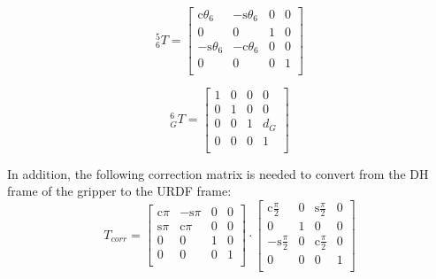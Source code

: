 \documentclass[twoside]{article}
\renewcommand{\c}{\text{c}}
\newcommand{\s}{\text{s}}
\newcommand{\T}[2]{\mbox{$_{#2}^{#1}{T}$}}
\begin{document}
\begin{minipage}{0.33\linewidth}
\begin{equation}
\T{5}{6} =
\begin{bmatrix}
  \c\theta_6 & -\s\theta_6 & 0 & 0 \\
           0 &           0 & 1 & 0 \\
 -\s\theta_6 & -\c\theta_6 & 0 & 0 \\
           0 &           0 & 0 & 1 \\
\end{bmatrix}
\end{equation}
\end{minipage}%
\begin{minipage}{0.33\linewidth}
\begin{equation}
\T{6}{G} =
\begin{bmatrix}
  1 & 0 & 0 &   0 \\
  0 & 1 & 0 &   0 \\
  0 & 0 & 1 & d_G \\
  0 & 0 & 0 &   1 \\
\end{bmatrix}
\end{equation}
\end{minipage}%
\begin{minipage}{0.33\linewidth}
\end{minipage}

\vspace{1ex}

In addition, the following correction matrix is needed to convert from the DH frame of the
gripper to the URDF frame:
\begin{equation}
  T_{corr} =
  \begin{bmatrix}
    \c\pi &  -\s\pi &  0 &  0 \\
    \s\pi &  \c\pi  &  0 &  0 \\
        0 &         0 &  1 &  0 \\
        0 &         0 &  0 &  1 \\
  \end{bmatrix}
  \cdot
  \begin{bmatrix}
      \c\frac{\pi}{2} &  0 &  \s\frac{\pi}{2} &  0 \\
               0 &  1 &           0 &  0 \\
     -\s\frac{\pi}{2} &  0 &  \c\frac{\pi}{2} &  0 \\
               0 &  0 &           0 &  1 \\
  \end{bmatrix}
\end{equation}
\end{document}
